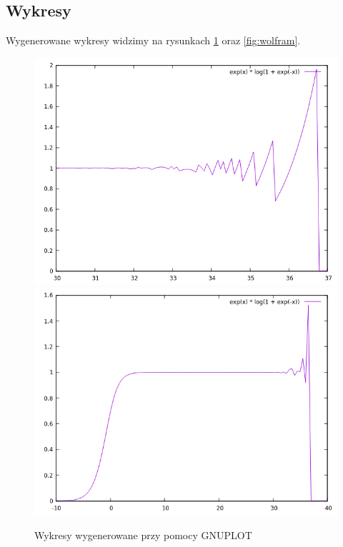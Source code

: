 \documentclass{article}
\begin{document}
        \subsection{Wykresy}
            Wygenerowane wykresy widzimy na rysunkach \ref{fig:gnuplot} oraz \ref{fig:wolfram}.
            \begin{figure}
                \centering                 \includegraphics[width=\textwidth]{gnuplot_30_37.png}                \includegraphics[width=\textwidth]{gnuplot_-10_40.png}
                \caption{Wykresy wygenerowane przy pomocy GNUPLOT}
                \label{fig:gnuplot}
            \end{figure}
\end{document}
